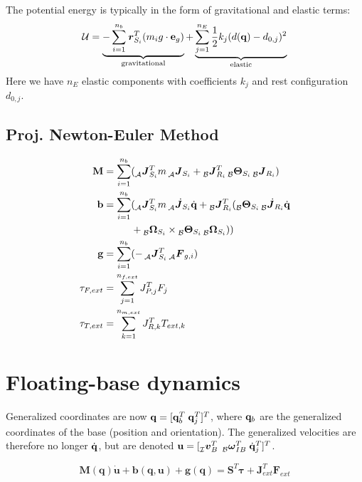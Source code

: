 \documentclass[a4paper, 8pt]{extarticle}
\newcommand{\mvec}[3]{  \prescript{}{\mathcal{#1}}{\bm{#2}}  _{#3} }
\newcommand{\mdvec}[3]{ \prescript{}{\mathcal{#1}}{\dot{\bm #2}} _{#3} }
\begin{document}
\begin{multicols*}{3}
The potential energy is typically in the form of gravitational and elastic terms:
$$\mathcal U = \underbrace{ -\sum_{i=1}^{n_b} \mvec{}{r}{S_i}^T (m_i g \cdot {\bf e}_{g}) }_{\text{gravitational}} + \underbrace{ \sum_{j = 1}^{n_E} \frac 12 k_j(d({\bf q}) - d_{0,j})^2}_{\text{elastic}}$$
Here we have $n_E$ elastic components with coefficients $k_j$ and rest configuration $d_{0,j}$.



\subsection{Proj. Newton-Euler Method}
\begin{align*}
\mathbf M &= \sum_{i = 1}^{n_b} (\mvec{A}{J}{S_i}^T m \mvec{A}{J}{S_i} + \mvec{B}{J}{R_i}^T \mvec{B}{\Theta}{S_i} \mvec{B}{J}{R_i}) \\
\mathbf b &= \sum_{i = 1}^{n_b} (\mvec{A}{J}{S_i}^T m \mdvec{A}{J}{S_i}\dot{\bf q} + \mvec{B}{J}{R_i}^T ( \mvec{B}{\Theta}{S_i} \mdvec{B}{J}{R_i}\dot{\bf q}\\
& \mkern50mu+ \mvec{B}{\Omega}{S_i} \times \mvec{B}{\Theta}{S_i} \mvec{B}{\Omega}{S_i})) \\
\mathbf g &= \sum_{i=1}^{n_b}(-\mvec{A}{J}{S_i}^T \mvec{A}{F}{g,i})\\
\tau _{F,ext} &= \sum_{j=1}^{n_{f,ext}} J_{P,j}^T F_{j}\\
\tau _{T,ext} &= \sum_{k=1}^{n_{m,ext}} J_{R,k}^T T_{ext,k}\\
\end{align*}


\section{Floating-base dynamics}

Generalized coordinates are now $\mathbf q = [ {\bf q} _b^T \;  {\bf q}_j^T ]^T$, where ${\bf q}_b$ are the generalized coordinates of the base (position and orientation). The generalized velocities are therefore no longer $\dot{\bf q}$, but are denoted ${\bf u} = [\mvec{I}{v}{B}^T \; \mvec{B}{\omega}{IB}^T \; \dot{\bf q}_j^T ]^T$.

$$\boxed{\mathbf{ M(q)\dot{u} + b(q, u) + g(q)} = \mathbf{S}^T\bm\tau + \mathbf{J}_{ext}^T \mathbf F_{ext}}$$


\end{multicols*}
\end{document}
